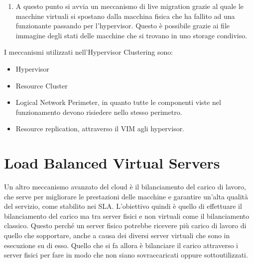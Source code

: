 \begin{enumerate}
    \item A questo punto si avvia un meccanismo di live migration grazie al quale le macchine virtuali si spostano dalla macchina fisica che ha fallito ad una funzionante passando per l'hypervisor. Questo è possibile grazie ai file immagine degli stati delle macchine che si trovano in uno storage condiviso. 
    
\end{enumerate}

I meccanismi utilizzati nell'Hypervisor Clustering sono:
\begin{itemize}
    \item Hypervisor
    \item Resource Cluster
    \item Logical Network Perimeter, in quanto tutte le componenti viste nel funzionamento devono risiedere nello stesso perimetro.
    \item Resource replication, attraverso il VIM agli hypervisor.
\end{itemize}

\section{Load Balanced Virtual Servers}
Un altro meccanismo avanzato del cloud è il bilanciamento del carico di lavoro, che serve per migliorare le prestazioni delle macchine e garantire un'alta qualità del servizio, come stabilito nei SLA. L'obiettivo quindi è quello di effettuare il bilanciamento del carico ma tra server fisici e non virtuali come il bilanciamento classico. Questo perché un server fisico potrebbe ricevere più carico di lavoro di quello che sopportare, anche a causa dei diversi server virtuali che sono in esecuzione su di esso. Quello che si fa allora è bilanciare il carico attraverso i server fisici per fare in modo che non siano sovraccaricati oppure sottoutilizzati. 

